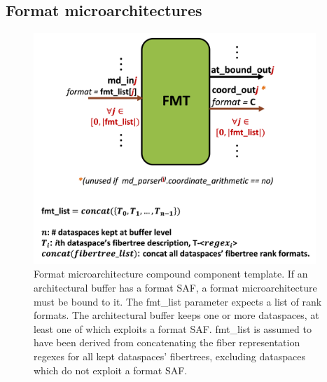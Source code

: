 \subsection{Format microarchitectures}

\begin{figure}[H]
    \centering
    \includegraphics[width=0.95\textwidth]{figures/FMT.png}
    \caption{Format microarchitecture compound component template. If an architectural buffer has a format SAF, a format microarchitecture must be bound to it. The fmt\_list parameter expects a list of rank formats. The architectural buffer keeps\cite{timeloop} one or more dataspaces\cite{timeloop}, at least one of which exploits a format SAF. fmt\_list is assumed to have been derived from concatenating the fiber representation regexes\cite{szebook} for all kept dataspaces' fibertrees, excluding dataspaces which do not exploit a format SAF.}
    \label{fig:FMT}
\end{figure}


